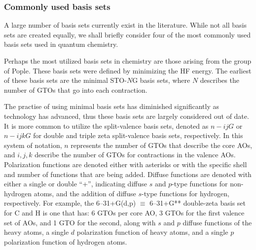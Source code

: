 \begin{doublespace}
\subsubsection{Commonly used basis sets}

A large number of basis sets currently exist in the
literature.\cite{Jensen2012} While not all basis sets are created equally, we
shall briefly consider four of the most commonly used basis sets used in
quantum chemistry.

\vspace{3mm}
\vspace{1mm}

Perhaps the most utilized basis sets in chemistry are those arising from the
group of Pople.\cite{Hehre1969, Ditchfield1971, Hehre1972} These basis sets were
defined by minimizing the HF energy. The earliest of these basis sets are
the minimal STO-$N$G basis sets, where $N$ describes the number of GTOs that go
into each contraction.

The practise of using minimal basis sets has diminished significantly as
technology has advanced, thus these basis sets are largely considered out of
date. It is more common to utilize the split-valence basis sets, denoted as
$n-ijG$ or $n-ijkG$ for double and triple zeta split-valence basis sets,
respectively. In this system of notation, $n$ represents the number of GTOs that
describe the core AOs, and $i, j, k$ describe the number of GTOs for
contractions in the valence AOs. Polarization functions are denoted either with
asterisks or with the specific shell and number of functions that are being
added. Diffuse functions are denoted with either a single or double ``+'',
indicating diffuse $s$ and $p$-type functions for non-hydrogen atoms, and the
addition of diffuse $s$-type functions for hydrogen, respectively. For example,
the 6--31+G(d,p) $\equiv$ 6--31+G** double-zeta basis set for C and H is one
that has: 6 GTOs per core AO, 3 GTOs for the first valence set of AOs, and 1 GTO
for the second, along with $s$ and $p$ diffuse functions of the heavy atoms, a
single $d$ polarization function of heavy atoms, and a single $p$ polarization
function of hydrogen atoms.

\vspace{3mm}
\vspace{1mm}


\end{doublespace}
